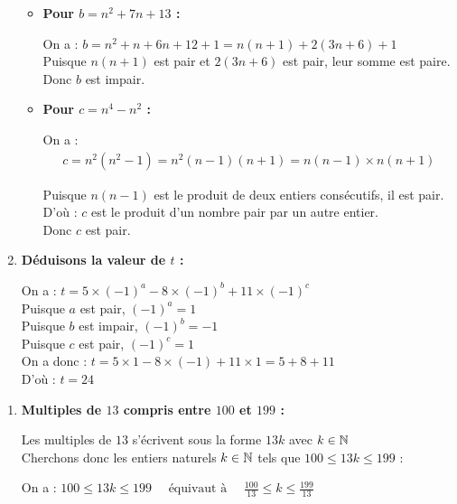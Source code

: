 \documentclass[10pt, a4paper]{article}
\begin{document}
\begin{multicols*}{2}
\begin{Solution}[APPLICATION][3]
\begin{enumerate}[leftmargin=*,itemsep=0.5pt]
\begin{itemize}[leftmargin=*,itemsep=0.5pt]
        \item \textbf{Pour $b = n^2 + 7n + 13$ :}

        On a : $b = n^2 + n + 6n + 12 + 1 = n(n+1) + 2(3n + 6) + 1$ \\
        Puisque $n(n+1)$ est pair et $2(3n+6)$ est pair, leur somme est paire. \\
        Donc $b$ est impair.

        \item \textbf{Pour $c = n^4 - n^2$ :}

        On a :
        \begin{align*}
c = n^2(n^2 - 1)
 = n^2(n-1)(n+1)
 = n(n-1) \times n(n+1)
\end{align*}

        Puisque $n(n-1)$ est le produit de deux entiers consécutifs, il est pair. \\
        D'où : $c$ est le produit d'un nombre pair par un autre entier. \\
        Donc $c$ est pair.
    \end{itemize}

    \item \textbf{Déduisons la valeur de $t$ :}

    On a : $t = 5 \times (-1)^a - 8 \times (-1)^b + 11 \times (-1)^c$ \\
    Puisque $a$ est pair, $(-1)^a = 1$ \\
    Puisque $b$ est impair, $(-1)^b = -1$ \\
    Puisque $c$ est pair, $(-1)^c = 1$ \\
    On a donc :
    $t = 5 \times 1 - 8 \times (-1) + 11 \times 1
     = 5 + 8 + 11$ \\
    D'où : \quad $t = 24$
\end{enumerate}
\end{Solution}

\begin{Solution}[APPLICATION][4]
\begin{enumerate}[leftmargin=*,itemsep=0.5pt]
    \item \textbf{Multiples de $13$ compris entre $100$ et $199$ :}

    Les multiples de $13$ s'écrivent sous la forme $13k$ avec $k \in \mathbb{N}$ \\
    Cherchons donc les entiers naturels $k \in \mathbb{N}$ tels que $100 \leq 13k \leq 199$ :

    On a : $100 \leq 13k \leq 199 \quad \text{ équivaut à } \quad \frac{100}{13} \leq k \leq \frac{199}{13}$


\end{enumerate}
\end{Solution}
\end{multicols*}
\end{document}
